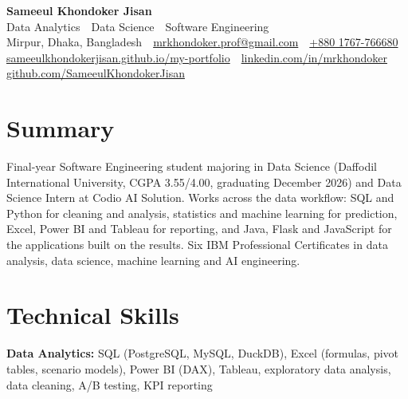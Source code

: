 \documentclass[10pt, letterpaper]{article}
\begin{document}
\begin{center}
    {\huge\bfseries Sameeul Khondoker Jisan}\\[4pt]
    {\large Data Analytics \,\textbar\, Data Science \,\textbar\, Software Engineering}\\[4pt]
    {\small
        Mirpur, Dhaka, Bangladesh
        \,\textbar\,
        \href{mailto:mrkhondoker.prof@gmail.com}{mrkhondoker.prof@gmail.com}
        \,\textbar\,
        \href{tel:+8801767766680}{+880 1767-766680}
    }\\[2pt]
    {\small
        \href{https://sameeulkhondokerjisan.github.io/my-portfolio/}{sameeulkhondokerjisan.github.io/my-portfolio}
        \,\textbar\,
        \href{https://www.linkedin.com/in/mrkhondoker/}{linkedin.com/in/mrkhondoker}
        \,\textbar\,
        \href{https://github.com/SameeulKhondokerJisan}{github.com/SameeulKhondokerJisan}
    }
\end{center}

\section{Summary}

Final-year Software Engineering student majoring in Data Science (Daffodil International University,
CGPA 3.55/4.00, graduating December 2026) and Data Science Intern at Codio AI Solution. Works across the
data workflow: SQL and Python for cleaning and analysis, statistics and machine learning for prediction,
Excel, Power BI and Tableau for reporting, and Java, Flask and JavaScript for the applications built on the
results. Six IBM Professional Certificates in data analysis, data science, machine learning and AI
engineering.

\section{Technical Skills}

\textbf{Data Analytics:} SQL (PostgreSQL, MySQL, DuckDB), Excel (formulas, pivot tables, scenario models),
Power BI (DAX), Tableau, exploratory data analysis, data cleaning, A/B testing, KPI reporting
\end{document}
